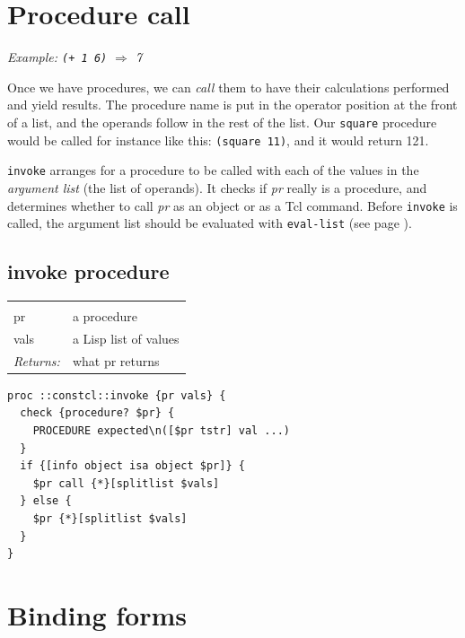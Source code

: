 \documentclass[a5paper,draft]{memoir}
\begin{document}
\section{Procedure call}
\label{procedure-call}

\emph{Example: \texttt{(+ 1 6)} $\Rightarrow$ 7}

Once we have procedures, we can \emph{call} them to have their calculations performed and yield results. The procedure name is put in the operator position at the front of a list, and the operands follow in the rest of the list. Our \texttt{square} procedure would be called for instance like this: \texttt{(square 11)}, and it would return 121.

\texttt{invoke} arranges for a procedure to be called with each of the values in the \emph{argument list} (the list of operands). It checks if \emph{pr} really is a procedure, and determines whether to call \emph{pr} as an object or as a Tcl command. Before \texttt{invoke} is called, the argument list should be evaluated with \texttt{eval-list} (see page \pageref{evallist-procedure}).

\subsection{invoke procedure}
\label{invoke-procedure}

\noindent\begin{tabular}{ |p{1.9cm} p{6.5cm}| }
\hline
\rowcolor[HTML]{CCCCCC} \multicolumn{2}{|l|}{\textbf{invoke (internal)}} \\
pr & a procedure \\
vals & a Lisp list of values \\
\textit{Returns:} & what pr returns \\
\hline
\end{tabular}

\begin{lstlisting}
proc ::constcl::invoke {pr vals} {
  check {procedure? $pr} {
    PROCEDURE expected\n([$pr tstr] val ...)
  }
  if {[info object isa object $pr]} {
    $pr call {*}[splitlist $vals]
  } else {
    $pr {*}[splitlist $vals]
  }
}
\end{lstlisting}

\section{Binding forms}
\label{binding-forms}
\end{document}
